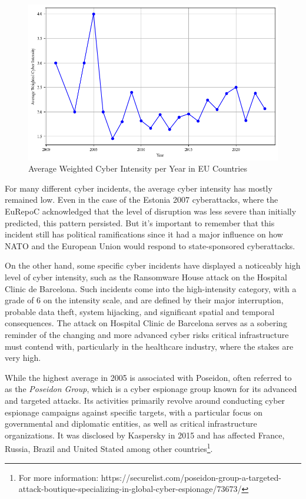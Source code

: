 \begin{figure}[H]
    \centering
    \includegraphics[width=\textwidth]{Images/avg.png}
    \caption{Average Weighted Cyber Intensity per Year in EU Countries}
    \label{fig:avg}
\end{figure}

For many different cyber incidents, the average cyber intensity has mostly remained low. Even in the case of the Estonia 2007 cyberattacks, where the EuRepoC acknowledged that the level of disruption was less severe than initially predicted, this pattern persisted. But it's important to remember that this incident still has political ramifications since it had a major influence on how NATO and the European Union would respond to state-sponsored cyberattacks.

On the other hand, some specific cyber incidents have displayed a noticeably high level of cyber intensity, such as the Ransomware House attack on the Hospital Clinic de Barcelona. Such incidents come into the high-intensity category, with a grade of 6 on the intensity scale, and are defined by their major interruption, probable data theft, system hijacking, and significant spatial and temporal consequences. The attack on Hospital Clinic de Barcelona serves as a sobering reminder of the changing and more advanced cyber risks critical infrastructure must contend with, particularly in the healthcare industry, where the stakes are very high.  

While the highest average in 2005 is associated with Poseidon, often referred to as the \textit{Poseidon Group}, which is a cyber espionage group known for its advanced and targeted attacks. Its activities primarily revolve around conducting cyber espionage campaigns against specific targets, with a particular focus on governmental and diplomatic entities, as well as critical infrastructure organizations. It was disclosed by Kaspersky in 2015 and has affected France, Russia, Brazil and United Stated among other countries\footnote{For more information: https://securelist.com/poseidon-group-a-targeted-attack-boutique-specializing-in-global-cyber-espionage/73673/}.


